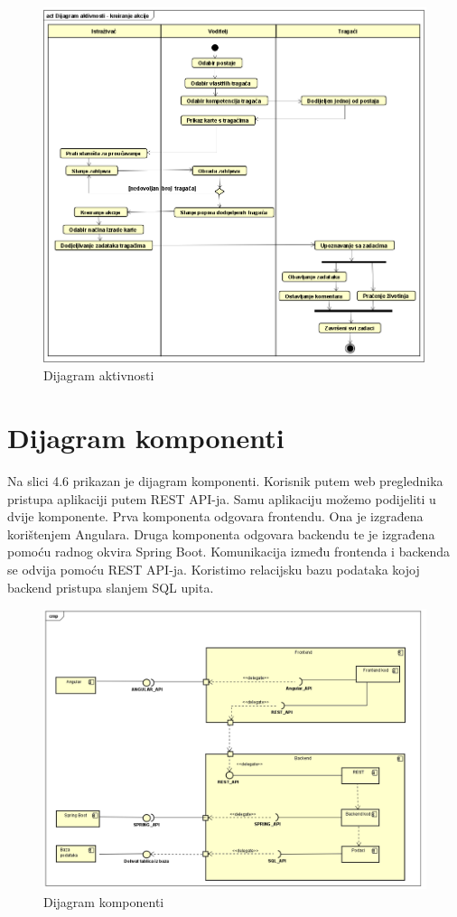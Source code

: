 		\begin{figure}[H]
			\centering
			\includegraphics[width=\textwidth]{slike/Dijagram_aktivnosti.PNG}
			\caption{Dijagram aktivnosti }
			\label{fig:dijagram_baze}
		\end{figure}
			
			\eject
			
		\section{Dijagram komponenti}
		
		Na slici 4.6 prikazan je dijagram komponenti. Korisnik putem web preglednika pristupa aplikaciji putem REST API-ja. Samu aplikaciju možemo podijeliti u dvije komponente. Prva komponenta odgovara frontendu. Ona je izgrađena korištenjem Angulara. Druga komponenta odgovara backendu te je izgrađena pomoću radnog okvira Spring Boot. Komunikacija između frontenda i backenda se odvija pomoću REST API-ja. Koristimo relacijsku bazu podataka kojoj backend pristupa slanjem SQL upita.
		
		\begin{figure}[H]
			\centering
			\includegraphics[width=\textwidth]{slike/Dijagram_komponenti.PNG}
			\caption{Dijagram komponenti }
			\label{fig:dijagram_baze}
		\end{figure}